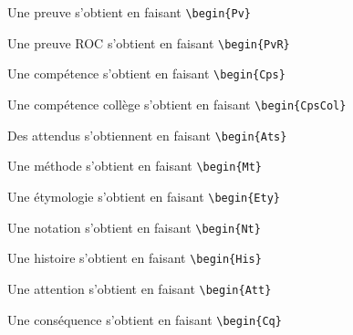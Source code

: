 \documentclass[a4paper,dvipsnames]{article}
\begin{document}
\begin{Pv}
Une preuve s'obtient en faisant \verb|\begin{Pv}|
\end{Pv}

\begin{PvR}
Une preuve ROC s'obtient en faisant \verb|\begin{PvR}|
\end{PvR}

\begin{Cps}
Une compétence s'obtient en faisant \verb|\begin{Cps}|
\end{Cps}

\begin{CpsCol}
Une compétence collège s'obtient en faisant \verb|\begin{CpsCol}|
\end{CpsCol}

\begin{Ats}
Des attendus s'obtiennent en faisant \verb|\begin{Ats}|
\end{Ats}

\begin{Mt}
Une méthode s'obtient en faisant \verb|\begin{Mt}|
\end{Mt}

\begin{Ety}
Une étymologie s'obtient en faisant \verb|\begin{Ety}|
\end{Ety}

\begin{Nt}
Une notation s'obtient en faisant \verb|\begin{Nt}|
\end{Nt}

\begin{His}
Une histoire s'obtient en faisant \verb|\begin{His}|
\end{His}

\begin{Att}
Une attention s'obtient en faisant \verb|\begin{Att}|
\end{Att}

\begin{Cq}
Une conséquence s'obtient en faisant \verb|\begin{Cq}|
\end{Cq}
\end{document}
